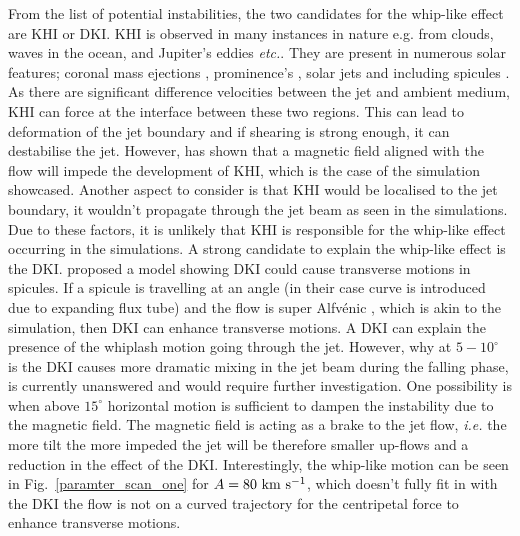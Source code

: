 \documentclass[12pt]{ociamthesis}
\newcommand{\Alfvenic}{Alfv\'{e}nic }
\newcommand{\kms}{~\rm{km ~s^{-1}}}
\newcommand{\np}{\\ \\}
\newcommand{\degs}{^{\circ}}
\begin{document}
From the list of potential instabilities, the two candidates for the whip-like effect are KHI or DKI. KHI is observed in many instances in nature e.g. from clouds, waves in the ocean, and Jupiter's eddies \textit{etc.}.  They are present in numerous solar features; coronal mass ejections \citep{Foullon2011ApJ729L8F, Foullon2013ApJ767170F}, prominence's \citep{Berger2010ApJ7161288B, Ryutova2010SoPh26775R}, solar jets \citep{Filippov2015MNRAS4511117F,Li2018NatSR88136L}  and including spicules \citep{Kuridze2016ApJ830133K, Antolin2018ApJ85644A}. As there are significant difference velocities between the jet and ambient medium, KHI can force at the interface between these two regions. This can lead to deformation of the jet boundary and if shearing is strong enough, it can destabilise the jet. However,  \cite{Chandrasekhar1961hhsbookC} has shown that a magnetic field aligned with the flow will impede the development of KHI, which is the case of the simulation showcased. Another aspect to consider is that KHI would be localised to the jet boundary, it wouldn't propagate through the jet beam as seen in the simulations. Due to these factors, it is unlikely that KHI is responsible for the whip-like effect occurring in the simulations. A strong candidate to explain the whip-like effect is the DKI. \cite{Zaqarashvili2020ApJ893L46Z} proposed a model showing DKI could cause transverse motions in spicules. If a spicule is travelling at an angle (in their case curve is introduced due to expanding flux tube) and the flow is super \Alfvenic, which is akin to the simulation, then DKI can enhance transverse motions. A DKI can explain the presence of the whiplash motion going through the jet. However, why at $5-10\degs$ is the DKI causes more dramatic mixing in the jet beam during the falling phase, is currently unanswered and would require further investigation. One possibility is when above $15^{\circ}$ horizontal motion is sufficient to dampen the instability due to the magnetic field. The magnetic field is acting as a brake to the jet flow, \textit{i.e.} the more tilt the more impeded the jet will be therefore smaller up-flows and a reduction in the effect of the DKI. Interestingly, the whip-like motion can be seen in Fig.~\ref{paramter_scan_one} for $A=80 \kms$, which doesn't fully fit in with the DKI the flow is not on a curved trajectory for the centripetal force to enhance transverse motions. \np 
\end{document}
